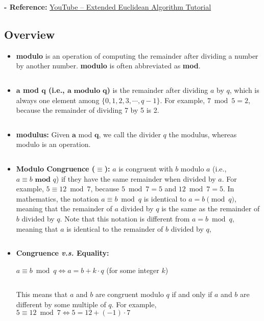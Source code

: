 \noindent \textbf{- Reference:} 
\href{https://www.youtube.com/watch?v=fz1vxq5ts5I}{YouTube -- Extended Euclidean Algorithm Tutorial}


\subsection{Overview}

\begin{tcolorbox}[title={\textbf{\tboxdef{\ref*{subsec:group-def}} Integer Modulo}}]

\begin{itemize}

\item \textbf{modulo} is an operation of computing the remainder after dividing a number by another number. \textbf{modulo} is often abbreviated as \textbf{mod}.

$ $

\item \textbf{$\bm{a}$ mod $\bm{q}$ (i.e., $\bm{a} \bm{\text{ modulo } q}$)} is the remainder after dividing $a$ by $q$, which is always one element among $\{0, 1, 2, 3, \cdots, q-1\}$. For example, $7 \bmod 5 = 2$, because the remainder of dividing 7 by 5 is 2. 

$ $

\item \textbf{modulus:} Given $\bm{a}$ mod $\bm{q}$, we call the divider $q$ the modulus, whereas modulo is an operation.

$ $

\item \textbf{Modulo Congruence ($\bm{\equiv}$):} $a$ is congruent with $b$ modulo $a$ (i.e., $a \equiv b \textbf{ mod } q$) if they have the same remainder when divided by $a$. For example, $5 \equiv 12 \bmod 7$, because $5 \bmod 7 = 5$ and $12 \bmod 7 = 5$. In mathematics, the notation $a \equiv b \bmod q$ is identical to $a = b \pmod q$, meaning that the remainder of $a$ divided by $q$ is the same as the remainder of $b$ divided by $q$. Note that this notation is different from $a = b \bmod q$, meaning that $a$ is identical to the remainder of $b$ divided by $q$, 

$ $

\item \textbf{Congruence \textit{v.s.} Equality:} 

$a \equiv b \bmod q \Longleftrightarrow a = b + k\cdot q$ \text{ } (for some integer $k$)

$ $

This means that $a$ and $b$ are congruent modulo $q$ if and only if $a$ and $b$ are different by some multiple of $q$. For example, $5 \equiv 12 \bmod 7 \Longleftrightarrow 5 = 12 + (-1)\cdot 7$

\end{itemize}

\end{tcolorbox}


